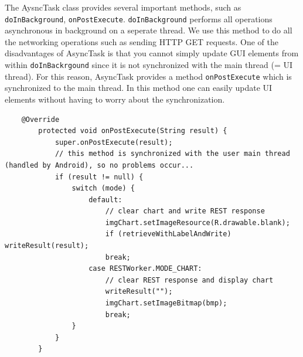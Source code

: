 \documentclass{report}
\begin{document}
The AysncTask class provides several important methods, such as \texttt{doInBackground}, \texttt{onPostExecute}. \texttt{doInBackground} performs all operations asynchronous in background on a seperate thread. We use this method to do all the networking operations such as sending HTTP GET requests. One of the disadvantages of AsyncTask is that you cannot simply update GUI elements from within \texttt{doInBackrgound} since it is not synchronized with the main thread (= UI thread). For this reason, AsyncTask provides a method \texttt{onPostExecute} which is synchronized to the main thread. In this method one can easily update UI elements without having to worry about the synchronization.

	\begin{lstlisting}
	@Override
		protected void onPostExecute(String result) {
			super.onPostExecute(result);
			// this method is synchronized with the user main thread (handled by Android), so no problems occur...
			if (result != null) {
				switch (mode) {
					default:
						// clear chart and write REST response
						imgChart.setImageResource(R.drawable.blank);
						if (retrieveWithLabelAndWrite) writeResult(result);
						break;
					case RESTWorker.MODE_CHART:
						// clear REST response and display chart
						writeResult("");
						imgChart.setImageBitmap(bmp);
						break;
				}
			}
		}
	\end{lstlisting}
\end{document}
